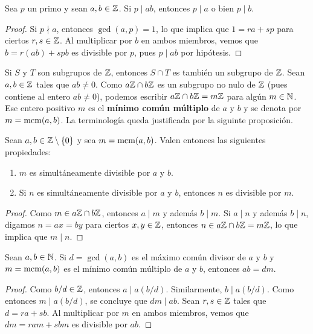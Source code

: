 \begin{proposition}
Sea $p$ un primo y sean $a,b\in\mathbb{Z}$. Si $p\mid ab$, entonces $p\mid a$ o bien $p\mid b$.
\end{proposition}

\begin{proof}
Si $p\nmid a$, entonces $\gcd(a,p)=1$, lo que implica que $1=ra+sp$ para ciertos $r,s\in\mathbb{Z}$. Al multiplicar por $b$ en ambos miembros, vemos que
$b=r(ab)+spb$ es divisible por $p$, pues $p\mid ab$ por hipótesis.
\end{proof}

Si $S$ y $T$ son subgrupos de $\mathbb{Z}$, entonces $S\cap T$ es también un subgrupo de $\mathbb{Z}$. 
Sean $a,b\in\mathbb{Z}$ tales que $ab\ne 0$. Como $a\mathbb{Z}\cap b\mathbb{Z}$ es un subgrupo 
no nulo de $\mathbb{Z}$ (pues contiene al entero $ab\ne 0$), podemos escribir $a\mathbb{Z}\cap b\mathbb{Z}=m\mathbb{Z}$ 
para algún $m\in\mathbb{N}$. Ese entero positivo $m$ 
es el \textbf{mínimo común múltiplo} de $a$ y $b$ y se denota por $m=\operatorname{mcm}(a,b)$. 
La terminología queda justificada por la siguinte proposición.

\begin{proposition}
Sean $a,b\in\mathbb{Z}\setminus\{0\}$ y sea $m=\operatorname{mcm}(a,b)$. Valen entonces las siguientes propiedades:
\begin{enumerate}
	\item $m$ es simultáneamente divisible por $a$ y $b$.
	\item Si $n$ es simultáneamente divisible por $a$ y $b$, entonces $n$ es divisible por $m$. 
\end{enumerate}	
\end{proposition}

\begin{proof}
    Como $m\in a\mathbb{Z}\cap b\mathbb{Z}$, entonces $a\mid m$ y además $b\mid m$. Si $a\mid n$ y además $b\mid n$, digamos $n=ax=by$ para ciertos $x,y\in\mathbb{Z}$, 
    entonces $n\in a\mathbb{Z}\cap b\mathbb{Z}=m\mathbb{Z}$, lo que implica que $m\mid n$. 
\end{proof}

\begin{proposition}
Sean $a,b\in\mathbb{N}$. Si $d=\gcd(a,b)$ es el máximo común divisor de $a$ y $b$ y $m=\operatorname{mcm}(a,b)$
es el mínimo común múltiplo de $a$ y $b$, entonces $ab=dm$.  	
\end{proposition}

\begin{proof}
Como $b/d\in\mathbb{Z}$, entonces $a\mid a(b/d)$. Similarmente, $b\mid a(b/d)$. Como entonces $m\mid a(b/d)$, se concluye que $dm\mid ab$. 
Sean $r,s\in\mathbb{Z}$ tales que $d=ra+sb$. Al multiplicar por $m$ en ambos miembros, vemos que $dm=ram+sbm$ es divisible por $ab$. 
\end{proof}

